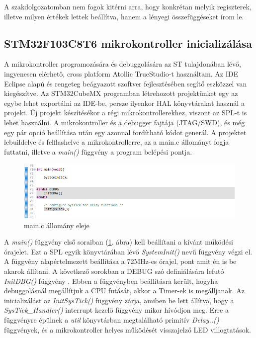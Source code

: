 \documentclass[../main.tex]{subfiles}
\begin{document}
        A szakdolgozatomban nem fogok kitérni arra, hogy konkrétan melyik regiszterek, illetve milyen értékek lettek beállítva, hanem a lényegi összefüggéseket írom le.
    
    \subsection{STM32F103C8T6 mikrokontroller inicializálása}
        A mikrokontroller programozására és debuggolására az ST tulajdonában lévő, ingyenesen elérhető, cross platform Atollic TrueStudio-t használtam. Az IDE Eclipse alapú és rengeteg beágyazott szoftver fejlesztésében segítő eszközzel van kiegészítve. Az STM32CubeMX programban létrehozott projektünket egy az egybe lehet exportálni az IDE-be, persze ilyenkor HAL könyvtárakat használ a projekt.
        Új projekt készítésékor a régi mikrokontrollerekhez, viszont az SPL-t is lehet használni. A mikrokontroller és a debugger fajtája (JTAG/SWD), és még egy pár opció beállítása után egy azonnal fordítható kódot generál.
        A projektet lebuildelve és felflashelve a mikrokontrollerre, az a main.c állományt fogja futtatni, illetve a \textit{main()} függvény a program belépési pontja.
        
        \begin{figure}[h!]
            \centering
                \includegraphics[width=13cm]{resources/mbed_res/ps_main_init.png}
                \caption{main.c állomány eleje}
                \label{fig:ps_main_init}
        \end{figure}
        
        A \textit{main()} függvény első soraiban (\ref{fig:ps_main_init}. ábra) kell beállítani a kívánt működési órajelet. Ezt a SPL egyik könyvtárában lévő \textit{SystemInit()} nevű függvény végzi el. A függvény alapértelmezett beállítása a 72MHz-es órajel, pont amit én is be akarok állítani. A következő sorokban a DEBUG szó definiálására lefutó \textit{InitDBG()} függvény \cite{peter_vass}. Ebben a függvényben beállításra került, hogyha debuggolásnál megállítjuk a CPU futását, akkor a Timer-ek is megálljanak. Az inicializálást az \textit{InitSysTick()} függvény zárja, amiben be lett állítva, hogy a \textit{SysTick_Handler()} interrupt kezelő függvény mikor hívódjon meg. Erre a függvényre épülnek a \textit{util} könyvtárban megtalálható primitív \textit{Delay..()} függvények, és a mikrokontroller helyes működését visszajelző LED villogtatások.
       
\end{document}
